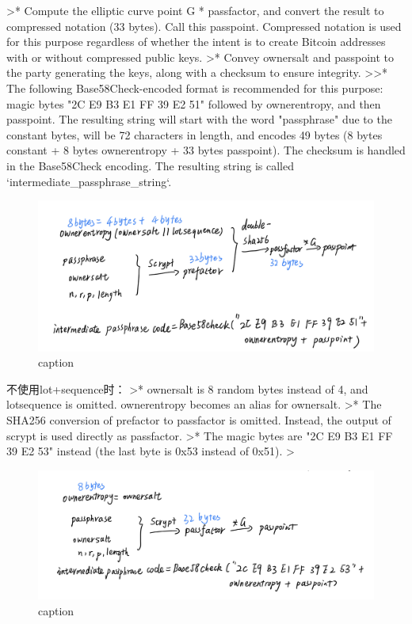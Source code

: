 >* Compute the elliptic curve point G * passfactor, and convert the result to compressed notation (33 bytes). Call this passpoint. Compressed notation is used for this purpose regardless of whether the intent is to create Bitcoin addresses with or without compressed public keys.
>* Convey ownersalt and passpoint to the party generating the keys, along with a checksum to ensure integrity.    
>>* The following Base58Check-encoded format is recommended for this purpose: magic bytes "2C E9 B3 E1 FF 39 E2 51" followed by ownerentropy, and then passpoint. The resulting string will start with the word "passphrase" due to the constant bytes, will be 72 characters in length, and encodes 49 bytes (8 bytes constant + 8 bytes ownerentropy + 33 bytes passpoint). The checksum is handled in the Base58Check encoding. The resulting string is called `intermediate_passphrase_string`.

\begin{figure}[h]
\centering
\includegraphics[width=.7\textwidth]{./im-code1.png}
\caption{caption}\label{fig-parsesig}
\end{figure}

不使用lot+sequence时：
>* ownersalt is 8 random bytes instead of 4, and lotsequence is omitted. ownerentropy becomes an alias for ownersalt.
>* The SHA256 conversion of prefactor to passfactor is omitted. Instead, the output of scrypt is used directly as passfactor.
>* The magic bytes are "2C E9 B3 E1 FF 39 E2 53" instead (the last byte is 0x53 instead of 0x51).
>


\begin{figure}[h]
\centering
\includegraphics[width=.7\textwidth]{./im-code2.png}
\caption{caption}\label{fig-parsesig}
\end{figure}

